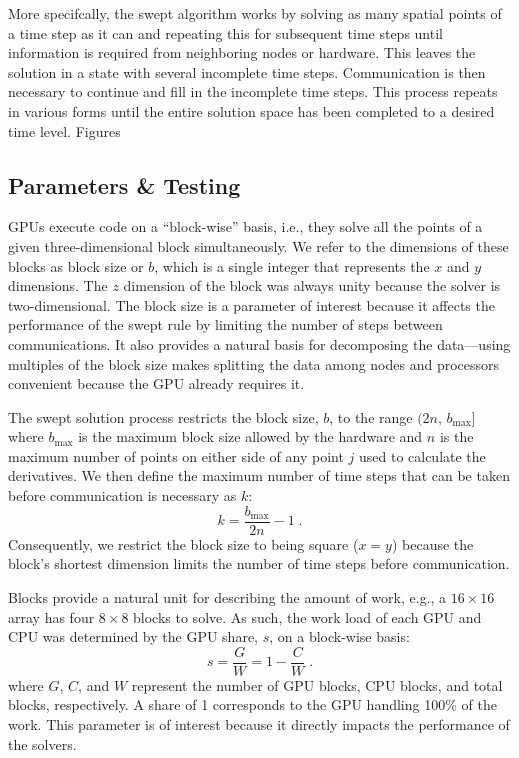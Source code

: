 \documentclass[mca,article,submit,moreauthors,pdftex]{Definitions/mdpi}
\begin{document}
\begin{paracol}{2}
\linenumbers
\switchcolumn

More specifcally, the swept algorithm works by solving as many spatial points of a time step as it can and repeating this for subsequent time steps until information is required from neighboring nodes or hardware. This leaves the solution in a state with several incomplete time steps. Communication is then necessary to continue and fill in the incomplete time steps. This process repeats in various forms until the entire solution space has been completed to a desired time level. Figures 

\subsection{Parameters \& Testing}
\label{parameters-section}

GPUs execute code on a ``block-wise'' basis, i.e., they solve all the points of a given three-dimensional block simultaneously. We refer to the dimensions of these blocks as block size or $b$, which is a single integer that represents the $x$ and $y$ dimensions. 
The $z$ dimension of the block was always unity because the solver is two-dimensional. The block size is a parameter of interest because it affects the performance of the swept rule by limiting the number of steps between communications. 
It also provides a natural basis for decomposing the data---using multiples of the block size makes splitting the data among nodes and processors convenient because the GPU already requires it.

The swept solution process restricts the block size, $b$, to the range $(2n,\,b_{\max}]$ where $b_{\max}$ is the maximum block size allowed by the hardware and $n$ is the maximum number of points on either side of any point $j$ used to calculate the derivatives. We then define the maximum number of time steps that can be taken before communication is necessary as $k$:
\begin{equation}
    \label{blocksize-equation}
    k = \frac{b_{\max}}{2n}-1 \;.
\end{equation}
Consequently, we restrict the block size to being square ($x=y$) because the block's shortest dimension limits the number of time steps before communication. 

Blocks provide a natural unit for describing the amount of work, e.g., a $16\times16$ array has four $8\times8$ blocks to solve. As such, the work load of each GPU and CPU was determined by the GPU share, $s$, on a block-wise basis:  
\begin{equation}
    \label{share-equation}
    s = \frac{G}{W} = 1-\frac{C}{W} \;.
\end{equation}
where $G$, $C$, and $W$ represent the number of GPU blocks, CPU blocks, and total blocks, respectively. 
A share of 1 corresponds to the GPU handling 100\% of the work.
This parameter is of interest because it directly impacts the performance of the solvers.


\end{paracol}
\end{document}
